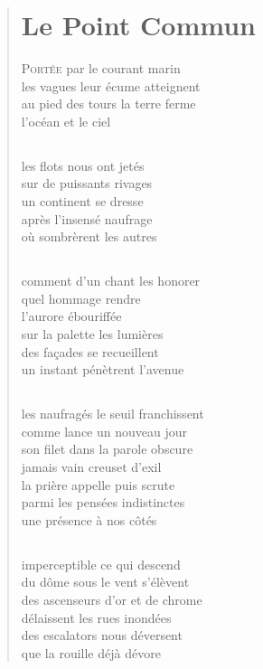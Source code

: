 \documentclass[a4paper,12pt,openright]{memoir}
\begin{document}
\begin{verse}
\settowidth{\versewidth}{jamais vain creuset d'exil}
\vspace{1cm}
\chapter*{Le Point Commun}
\vspace{1cm}
{\lettrine[lines=1]{\textcolor[gray]{0.6}{P}}{ortée} par le courant marin}\\
les vagues leur écume atteignent\\
au pied des tours la terre ferme\\
l'océan et le ciel
 
\section*{}
les flots nous ont jetés\\
sur de puissants rivages\\
un continent se dresse\\
après l'insensé naufrage\\
où sombrèrent les autres

\section*{}
comment d'un chant les honorer\\
quel hommage rendre\\
l'aurore ébouriffée\\
sur la palette les lumières\\
des façades se recueillent\\
un instant pénètrent l'avenue

\section*{}
les naufragés le seuil franchissent\\
comme lance un nouveau jour\\
son filet dans la parole obscure\\
jamais vain creuset d'exil\\
la prière appelle puis scrute\\
parmi les pensées indistinctes\\
une présence à nos côtés

\section*{}
imperceptible ce qui descend\\
du dôme sous le vent s'élèvent\\
des ascenseurs d'or et de chrome\\
délaissent les rues inondées\\
des escalators nous déversent\\
que la rouille déjà dévore


\end{verse}
\end{document}
